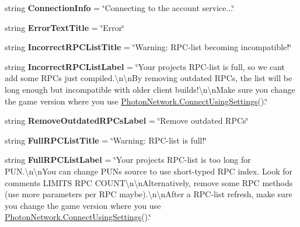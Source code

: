 \begin{DoxyCompactItemize}
\item 
string {\bfseries Connection\+Info} = \char`\"{}Connecting to the account service...\char`\"{}\hypertarget{class_pun_wizard_text_a1a379fc2eeae758a101de927a5ed0d8f}{}\label{class_pun_wizard_text_a1a379fc2eeae758a101de927a5ed0d8f}

\item 
string {\bfseries Error\+Text\+Title} = \char`\"{}Error\char`\"{}\hypertarget{class_pun_wizard_text_aa84cb016d8a443bb42ec4d0c36661ef4}{}\label{class_pun_wizard_text_aa84cb016d8a443bb42ec4d0c36661ef4}

\item 
string {\bfseries Incorrect\+R\+P\+C\+List\+Title} = \char`\"{}Warning\+: R\+PC-\/list becoming incompatible!\char`\"{}\hypertarget{class_pun_wizard_text_aa1fdd0087b794699ee957c122901e9cf}{}\label{class_pun_wizard_text_aa1fdd0087b794699ee957c122901e9cf}

\item 
string {\bfseries Incorrect\+R\+P\+C\+List\+Label} = \char`\"{}Your project\textquotesingle{}s R\+PC-\/list is full, so we can\textquotesingle{}t add some R\+P\+Cs just compiled.\textbackslash{}n\textbackslash{}n\+By removing outdated R\+P\+Cs, the list will be long enough but incompatible with older client builds!\textbackslash{}n\textbackslash{}n\+Make sure you change the game version where you use \hyperlink{class_photon_network_a0fdb79bcce45801ec81fbe56ffb939ec}{Photon\+Network.\+Connect\+Using\+Settings}().\char`\"{}\hypertarget{class_pun_wizard_text_ad9f6dfd3a6fbb40839917b1993cdf368}{}\label{class_pun_wizard_text_ad9f6dfd3a6fbb40839917b1993cdf368}

\item 
string {\bfseries Remove\+Outdated\+R\+P\+Cs\+Label} = \char`\"{}Remove outdated R\+P\+Cs\char`\"{}\hypertarget{class_pun_wizard_text_accdbd125183979cb39ee61448e048aa4}{}\label{class_pun_wizard_text_accdbd125183979cb39ee61448e048aa4}

\item 
string {\bfseries Full\+R\+P\+C\+List\+Title} = \char`\"{}Warning\+: R\+PC-\/list is full!\char`\"{}\hypertarget{class_pun_wizard_text_a7d39669365eb40c15a25f1bf842d6b68}{}\label{class_pun_wizard_text_a7d39669365eb40c15a25f1bf842d6b68}

\item 
string {\bfseries Full\+R\+P\+C\+List\+Label} = \char`\"{}Your project\textquotesingle{}s R\+PC-\/list is too long for P\+U\+N.\textbackslash{}n\textbackslash{}n\+You can change P\+UN\textquotesingle{}s source to use short-\/typed R\+PC index. Look for comments \textquotesingle{}L\+I\+M\+I\+TS R\+PC C\+O\+U\+NT\textquotesingle{}\textbackslash{}n\textbackslash{}n\+Alternatively, remove some R\+PC methods (use more parameters per R\+PC maybe).\textbackslash{}n\textbackslash{}n\+After a R\+PC-\/list refresh, make sure you change the game version where you use \hyperlink{class_photon_network_a0fdb79bcce45801ec81fbe56ffb939ec}{Photon\+Network.\+Connect\+Using\+Settings}().\char`\"{}\hypertarget{class_pun_wizard_text_a304fd8e76cdaba433a5838962201f4f7}{}\label{class_pun_wizard_text_a304fd8e76cdaba433a5838962201f4f7}


\end{DoxyCompactItemize}
